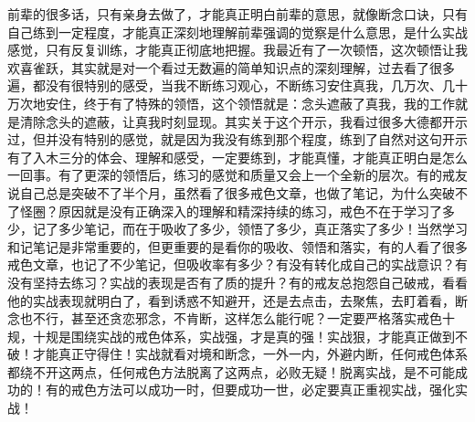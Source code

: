 \begin{case}
    前辈的很多话，只有亲身去做了，才能真正明白前辈的意思，就像断念口诀，只有自己练到一定程度，才能真正深刻地理解前辈强调的觉察是什么意思，是什么实战感觉，只有反复训练，才能真正彻底地把握。我最近有了一次顿悟，这次顿悟让我欢喜雀跃，其实就是对一个看过无数遍的简单知识点的深刻理解，过去看了很多遍，都没有很特别的感受，当我不断练习观心，不断练习安住真我，几万次、几十万次地安住，终于有了特殊的领悟，这个领悟就是：念头遮蔽了真我，我的工作就是清除念头的遮蔽，让真我时刻显现。其实关于这个开示，我看过很多大德都开示过，但并没有特别的感觉，就是因为我没有练到那个程度，练到了自然对这句开示有了入木三分的体会、理解和感受，一定要练到，才能真懂，才能真正明白是怎么一回事。有了更深的领悟后，练习的感觉和质量又会上一个全新的层次。有的戒友说自己总是突破不了半个月，虽然看了很多戒色文章，也做了笔记，为什么突破不了怪圈？原因就是没有正确深入的理解和精深持续的练习，戒色不在于学习了多少，记了多少笔记，而在于吸收了多少，领悟了多少，真正落实了多少！当然学习和记笔记是非常重要的，但更重要的是看你的吸收、领悟和落实，有的人看了很多戒色文章，也记了不少笔记，但吸收率有多少？有没有转化成自己的实战意识？有没有坚持去练习？实战的表现是否有了质的提升？有的戒友总抱怨自己破戒，看看他的实战表现就明白了，看到诱惑不知避开，还是去点击，去聚焦，去盯着看，断念也不行，甚至还贪恋邪念，不肯断，这样怎么能行呢？一定要严格落实戒色十规，十规是围绕实战的戒色体系，实战强，才是真的强！实战狠，才能真正做到不破！才能真正守得住！实战就看对境和断念，一外一内，外避内断，任何戒色体系都绕不开这两点，任何戒色方法脱离了这两点，必败无疑！脱离实战，是不可能成功的！有的戒色方法可以成功一时，但要成功一世，必定要真正重视实战，强化实战！


\end{case}
